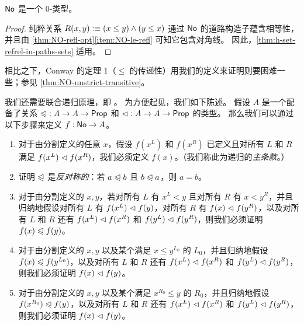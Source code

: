 \begin{cor}\label{thm:NO-set}
  $\mathsf{No}$ 是一个 $0$-类型。
\end{cor}

\begin{proof}
  纯粹关系 $R(x,y)\vcentcolon\equiv (x\le y) \land (y\le x)$ 通过 $\mathsf{No}$ 的道路构造子蕴含相等性，并且由 \cref{thm:NO-refl-opt}\ref{item:NO-le-refl} 可知它包含对角线。
  因此，\cref{thm:h-set-refrel-in-paths-sets} 适用。
\end{proof}

相比之下，Conway 的定理 1（$\le$ 的传递性）用我们的定义来证明则要困难一些；参见 \cref{thm:NO-unstrict-transitive}。



我们还需要联合递归原理，即 。
为方便起见，我们如下陈述。
假设 $A$ 是一个配备了关系 $\mathord{\trianglelefteqslant}:A\to A\to\mathsf{Prop}$ 和 $\mathord{\vartriangleleft}:A\to A\to\mathsf{Prop}$ 的类型。
那么我们可以通过以下步骤来定义 $f:\mathsf{No}\to A$。

\begin{enumerate}
\item 对于由分割定义的任意 $x$，假设 $f(x^L)$ 和 $f(x^R)$ 已定义且对所有 $L$ 和 $R$ 满足 $f(x^L)\vartriangleleft f(x^R)$，我们必须定义 $f(x)$。（我们称此为递归的\emph{主条款}。）\label{item:NO-rec-primary}
\item 证明 $\trianglelefteqslant$ 是\emph{反对称的}：若 $a\trianglelefteqslant b$ 且 $b\trianglelefteqslant a$，则 $a=b$。
\item 对于由分割定义的 $x,y$，若对所有 $L$ 有 $x^L<y$ 且对所有 $R$ 有 $x<y^R$，并且归纳地假设对所有 $L$ 有 $f(x^L)\vartriangleleft f(y)$，对所有 $R$ 有 $f(x)\vartriangleleft f(y^R)$，以及对所有 $L$ 和 $R$ 还有 $f(x^L)\vartriangleleft f(x^R)$ 和 $f(y^L)\vartriangleleft f(y^R)$，则我们必须证明 $f(x)\trianglelefteqslant f(y)$。
\item 对于由分割定义的 $x,y$ 以及某个满足 $x\le y^{L_0}$ 的 $L_0$，并且归纳地假设 $f(x)\trianglelefteqslant f(y^{L_0})$，以及对所有 $L$ 和 $R$ 还有 $f(x^L)\vartriangleleft f(x^R)$ 和 $f(y^L)\vartriangleleft f(y^R)$，则我们必须证明 $f(x)\vartriangleleft f(y)$。
\item 对于由分割定义的 $x,y$ 以及某个满足 $x^{R_0}\le y$ 的 $R_0$，并且归纳地假设 $f(x^{R_0})\trianglelefteqslant f(y)$，以及对所有 $L$ 和 $R$ 还有 $f(x^L)\vartriangleleft f(x^R)$ 和 $f(y^L)\vartriangleleft f(y^R)$，则我们必须证明 $f(x)\vartriangleleft f(y)$。\label{item:NO-rec-last}
\end{enumerate}

